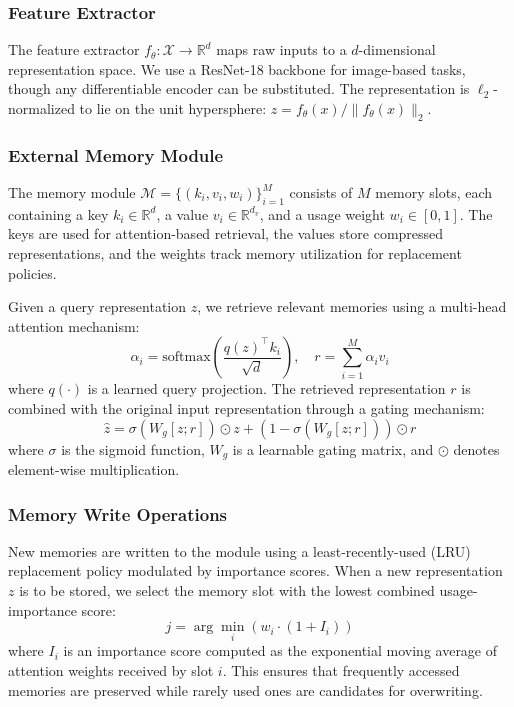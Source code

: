 \documentclass[11pt]{article}
\begin{document}
\subsubsection{Feature Extractor}

The feature extractor $f_\theta: \mathcal{X} \rightarrow \mathbb{R}^d$ maps raw inputs to a $d$-dimensional representation space. We use a ResNet-18 backbone \citep{he2016deep} for image-based tasks, though any differentiable encoder can be substituted. The representation is $\ell_2$-normalized to lie on the unit hypersphere: $z = f_\theta(x) / \|f_\theta(x)\|_2$.

\subsubsection{External Memory Module}

The memory module $\mathcal{M} = \{(k_i, v_i, w_i)\}_{i=1}^{M}$ consists of $M$ memory slots, each containing a key $k_i \in \mathbb{R}^d$, a value $v_i \in \mathbb{R}^{d_v}$, and a usage weight $w_i \in [0, 1]$. The keys are used for attention-based retrieval, the values store compressed representations, and the weights track memory utilization for replacement policies.

Given a query representation $z$, we retrieve relevant memories using a multi-head attention mechanism:
\begin{equation}
    \alpha_i = \text{softmax}\left(\frac{q(z)^\top k_i}{\sqrt{d}}\right), \quad r = \sum_{i=1}^{M} \alpha_i v_i
\end{equation}
where $q(\cdot)$ is a learned query projection. The retrieved representation $r$ is combined with the original input representation through a gating mechanism:
\begin{equation}
    \hat{z} = \sigma(W_g [z; r]) \odot z + (1 - \sigma(W_g [z; r])) \odot r
\end{equation}
where $\sigma$ is the sigmoid function, $W_g$ is a learnable gating matrix, and $\odot$ denotes element-wise multiplication.

\subsubsection{Memory Write Operations}

New memories are written to the module using a least-recently-used (LRU) replacement policy modulated by importance scores. When a new representation $z$ is to be stored, we select the memory slot with the lowest combined usage-importance score:
\begin{equation}
    j = \arg\min_i \left( w_i \cdot (1 + I_i) \right)
\end{equation}
where $I_i$ is an importance score computed as the exponential moving average of attention weights received by slot $i$. This ensures that frequently accessed memories are preserved while rarely used ones are candidates for overwriting.
\end{document}
